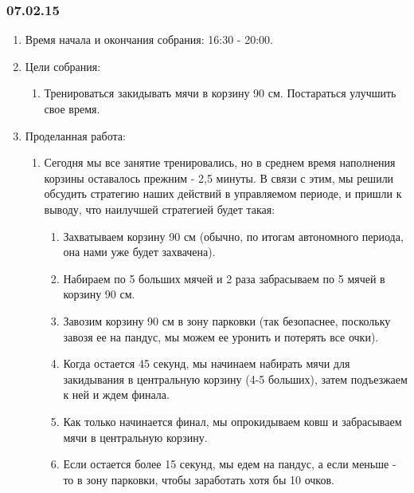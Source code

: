 \subsubsection{07.02.15}
\begin{enumerate}
	
	\item Время начала и окончания собрания: 16:30 - 20:00.
	
	\item Цели собрания: 
	\begin{enumerate}
		
		\item Тренироваться закидывать мячи в корзину 90 см. Постараться улучшить свое время.
		
	\end{enumerate}

	\item Проделанная работа:
	\begin{enumerate}
		
		\item Сегодня мы все занятие тренировались, но в среднем время наполнения корзины оставалось прежним - 2,5 минуты. В связи с этим, мы решили обсудить стратегию наших действий в управляемом периоде, и пришли к выводу, что наилучшей стратегией будет такая:
			\begin{enumerate} 
				\item Захватываем корзину 90 см (обычно, по итогам автономного периода, она нами уже будет захвачена).
				 
				\item Набираем по 5 больших мячей и 2 раза забрасываем по 5 мячей в корзину 90 см. 
				
				\item Завозим корзину 90 см в зону парковки (так безопаснее, поскольку завозя ее на пандус, мы можем ее уронить и потерять все очки). 
				
				\item Когда остается 45 секунд, мы начинаем набирать мячи для закидывания в центральную корзину (4-5 больших), затем подъезжаем к ней и ждем финала. 
				
				\item Как только начинается финал, мы опрокидываем ковш и забрасываем мячи в центральную корзину.
				
				\item Если остается более 15 секунд, мы едем на пандус, а если меньше - то в зону парковки, чтобы заработать хотя бы 10 очков.
				

\end{enumerate}
\end{enumerate}
\end{enumerate}
